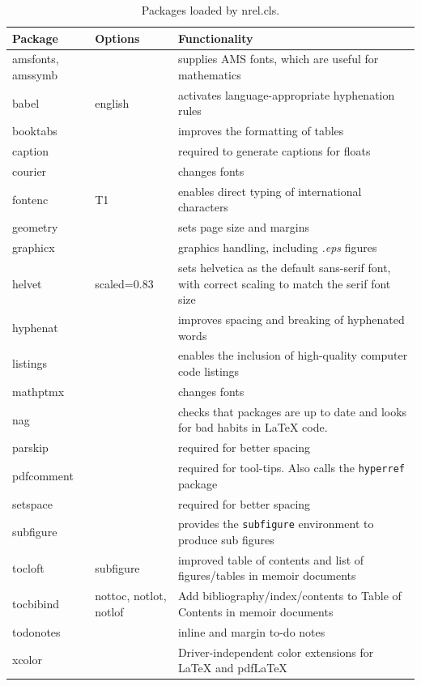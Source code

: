 \begin{table}[!h]
\centering
\caption[Packages loaded by the nrel.cls class]{Packages loaded by nrel.cls.}
\label{Tab:Packages}
\begin{tabular*}{\textwidth}{llp{}}
\toprule
Package & Options & Functionality\\
\midrule
amsfonts, amssymb & & supplies AMS fonts, which are useful for mathematics \\
babel & english & activates language-appropriate hyphenation rules\\
booktabs & & improves the formatting of tables \\
caption & & required to generate captions for floats\\
courier& & changes fonts \\
fontenc & T1 & enables direct typing of international characters \\
geometry & & sets page size and margins \\
graphicx & & graphics handling, including \emph{.eps} figures \\
helvet& scaled=0.83 & sets helvetica as the default sans-serif font, with correct scaling to match the serif font size\\
hyphenat & & improves spacing and breaking of hyphenated words \\
listings & & enables the inclusion of high-quality computer code listings\\
mathptmx& & changes fonts \\
nag & & checks that packages are up to date and looks for bad habits in LaTeX code. \\
parskip & & required for better spacing\\
pdfcomment & & required for tool-tips. Also calls the \texttt{hyperref} package  \\
setspace & & required for better spacing\\
subfigure & & provides the \texttt{subfigure} environment to produce sub figures \\
tocloft & subfigure & improved table of contents and list of figures/tables in memoir documents\\
tocbibind & nottoc, notlot, notlof & Add bibliography/index/contents to Table of Contents in memoir documents\\
todonotes & & inline and margin to-do notes \\
xcolor & & Driver-independent color extensions for LaTeX and pdfLaTeX\\
\bottomrule
\end{tabular*}
\end{table}

